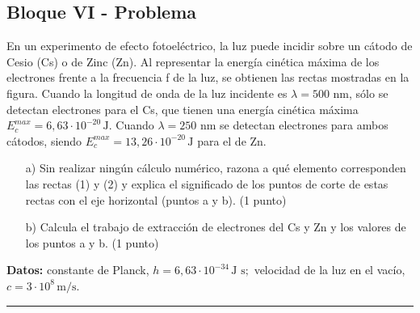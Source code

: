 \subsection{Bloque VI - Problema}
\label{subsec:B6_2017_jul_ext}

\begin{cajaenunciado}
En un experimento de efecto fotoeléctrico, la luz puede incidir sobre un cátodo de Cesio (Cs) o de Zinc (Zn). Al representar la energía cinética máxima de los electrones frente a la frecuencia f de la luz, se obtienen las rectas mostradas en la figura. Cuando la longitud de onda de la luz incidente es $\lambda=500$ nm, sólo se detectan electrones para el Cs, que tienen una energía cinética máxima $E_{c}^{max}=6,63\cdot10^{-20}\,\text{J}$. Cuando $\lambda=250$ nm se detectan electrones para ambos cátodos, siendo $E_{c}^{max}=13,26\cdot10^{-20}\,\text{J}$ para el de Zn.
\begin{enumerate}
    \item[a)] Sin realizar ningún cálculo numérico, razona a qué elemento corresponden las rectas (1) y (2) y explica el significado de los puntos de corte de estas rectas con el eje horizontal (puntos a y b). (1 punto)
    \item[b)] Calcula el trabajo de extracción de electrones del Cs y Zn y los valores de los puntos a y b. (1 punto)
\end{enumerate}
\textbf{Datos:} constante de Planck, $h=6,63\cdot10^{-34}\,\text{J s};$ velocidad de la luz en el vacío, $c=3\cdot10^{8}\,\text{m/s}$.
\end{cajaenunciado}
\hrule

